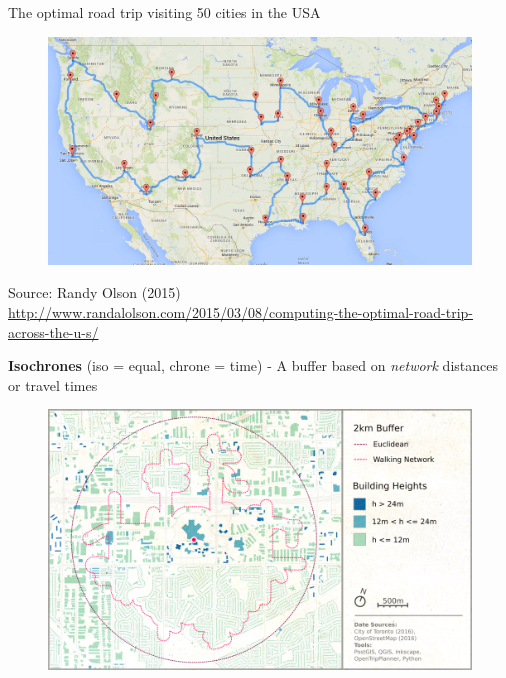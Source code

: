 \documentclass[aspectratio=169]{beamer}
\begin{document}
\begin{frame}
	\small The optimal road trip visiting 50 cities in the USA
	\begin{figure}
		\centering
		\includegraphics[width=0.9\linewidth]{images/travel_usa}
	\end{figure}
	
	\tiny Source: Randy Olson (2015)  \url{http://www.randalolson.com/2015/03/08/computing-the-optimal-road-trip-across-the-u-s/}
\end{frame}	


\begin{frame}
	
	\textbf{Isochrones} (iso = equal, chrone = time) - A buffer based on \textit{network} distances or travel times
	
	
	\begin{figure}
		\centering
		\includegraphics[width=0.8\linewidth]{images/STC_buffers}
	\end{figure}
	
	
\end{frame}
\end{document}
